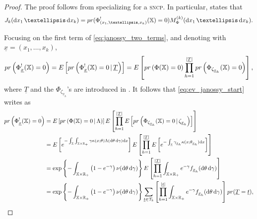\documentclass[10pt,a4paper]{amsart}
\newcommand{\E}{E}
\newcommand{\R}{\mathbb{R}}
\newcommand{\X}{\mathbb{X}}
\newcommand{\calT}{\mathcal{T}}
\newcommand{\dd}{\mathrm d}
\newcommand{\prob}{{\rm pr}}
\renewcommand{\mid}{\ensuremath{\,|\,}}
\begin{document}
\begin{proof}
The proof follows from specializing  for a \textsc{sncp}. In particular,  states that
\begin{equation}\label{eq:janossy_two_terms}
    J_k(\dd x_1\,\ldots\, \dd x_k) = \prob(\Phi^!_{(x_1,\ldots,x_k)}(\X) = 0)  M^{(k)}_{\Phi}(\dd x_1\,\ldots\, \dd x_k).
\end{equation}

Focusing on the first term of \eqref{eq:janossy_two_terms}, and denoting with $\underline{x} = (x_1,\ldots,x_k)$,
\begin{equation}\label{eq:ev_janossy_start}
        \prob \left( \Phi^!_{\underline{x}}(\X) = 0 \right) = \E \left[ \prob \left( \Phi^!_{\underline{x}}(\X) = 0 \mid \underline{T} \right) \right] = \E \left[ \prob \left( \Phi(\X) = 0 \right) \prod_{h=1}^{|\underline{T}|} \prob \left( \Phi_{\zeta_{\underline{x}_h}}(\X) = 0 \right)  \right], 
\end{equation}
where $\underline{T}$ and the $\Phi_{\zeta_{\underline{x}_h}}$'s are introduced in . It follows that \eqref{eq:ev_janossy_start} writes as
\begin{equation*}
   \begin{aligned}
       \prob \left( \Phi^!_{\underline{x}}(\X) = 0 \right) &= \E\left[ \prob \left( \Phi(\X) = 0 \mid \Lambda \right)\right] \E \left[ \prod_{h=1}^{|\underline{T}|} \E\left[ \prob \left( \Phi_{\zeta_{\underline{x}_h}}(\X) = 0 \mid \zeta_{\underline{x}_h}\right)\right]  \right]\\
       &= \E\left[ e^{- \int_{\X} \int_{\X\times\R_+} \gamma \kappa(x; \theta) \Lambda(\dd \theta\, \dd \gamma) \dd x} \right] \E\left[ \prod_{h=1}^{|\underline{T}|} \E\left[ e^{- \int_{\X} \gamma_{\underline{x}_h} \kappa(x; \theta_{\underline{x}_h}) \dd x} \right] \right]\\
       &= \exp\left\{ - \int_{\X\times\R_+} \left(1 - e^{- \gamma } \right) \nu(\dd \theta \, \dd \gamma) \right\} \E\left[ \prod_{h=1}^{|\underline{T}|} \int_{\X\times\R_+} e^{-\gamma } f_{\underline{x}_h}(\dd\theta \, \dd \gamma) \right]\\
       &= \exp\left\{ - \int_{\X\times\R_+} \left(1 - e^{- \gamma  } \right) \nu(\dd \theta\, \dd \gamma) \right\} \sum_{\underline{t} \in \calT_k} \left[ \prod_{h=1}^{|\underline{t}|} \int_{\X\times\R_+} e^{-\gamma } f_{\underline{x}_h}(\dd\theta \, \dd \gamma) \right] \prob(\underline{T} = \underline{t}),
   \end{aligned} 

\end{equation*}
\end{proof}
\end{document}
